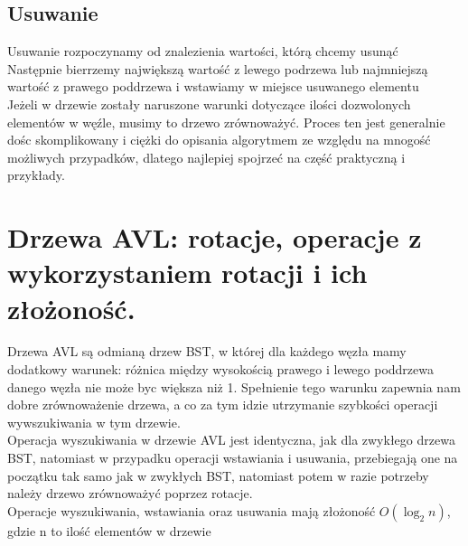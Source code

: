 \documentclass[12pt]{article}
\begin{document}
    \subsection{Usuwanie}
    Usuwanie rozpoczynamy od znalezienia wartości, którą chcemy usunąć \\
    \noindent Następnie bierrzemy największą wartość z lewego podrzewa lub najmniejszą wartość z prawego poddrzewa i wstawiamy w miejsce usuwanego elementu \\
    \noindent Jeżeli w drzewie zostały naruszone warunki dotyczące ilości dozwolonych elementów w węźle, musimy to drzewo zrównoważyć. Proces ten jest generalnie dośc skomplikowany i ciężki do opisania algorytmem ze względu na mnogość możliwych przypadków, dlatego najlepiej spojrzeć na część praktyczną i przykłady.
    
    \newpage
    
    
    \section{Drzewa AVL: rotacje, operacje z wykorzystaniem rotacji i ich złożoność.}
    Drzewa AVL są odmianą drzew BST, w której dla każdego węzła mamy dodatkowy warunek: różnica między wysokością prawego i lewego poddrzewa danego węzła nie może byc większa niż 1.
    Spełnienie tego warunku zapewnia nam dobre zrównoważenie drzewa, a co za tym idzie utrzymanie szybkości operacji wywszukiwania w tym drzewie.\\
    
    \noindent Operacja wyszukiwania w drzewie AVL jest identyczna, jak dla zwykłego drzewa BST, natomiast w przypadku operacji wstawiania i usuwania, przebiegają one na początku tak samo jak w zwykłych BST, natomiast potem w razie potrzeby należy drzewo zrównoważyć poprzez rotacje. \\
    
    \noindent Operacje wyszukiwania, wstawiania oraz usuwania mają złożoność $O(\log_{2} n)$, gdzie n to ilość elementów w drzewie
    
\end{document}
